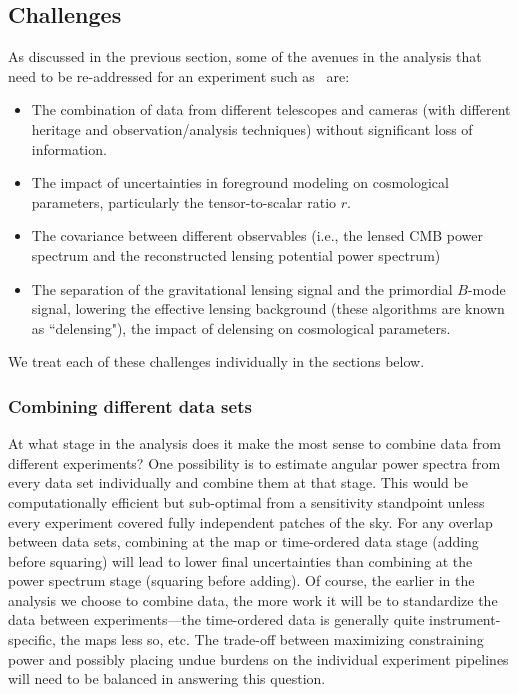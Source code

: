\subsection{Challenges}
\label{se:challenges}
As discussed in the previous section, some of the avenues in the analysis that need to be re-addressed for an experiment such as \cmbexp\ are: 
\begin{itemize}
\item{The combination of data from different telescopes and cameras (with different heritage 
and observation/analysis techniques) without significant loss of information.}
\item{The impact of uncertainties in foreground modeling on cosmological parameters, particularly the tensor-to-scalar ratio $r$.}
\item{The covariance between different observables (i.e., the lensed CMB power spectrum and the reconstructed lensing potential power spectrum)}
\item{The separation of the gravitational lensing signal and the primordial $B$-mode signal, lowering the effective lensing background (these algorithms are known as ``delensing"), the impact of delensing on cosmological parameters.} 
\end{itemize}
We treat each of these challenges individually in the sections below.

\subsubsection{Combining different data sets}
\label{se:combine}
At what stage in the analysis does it make the most sense to combine data from different experiments? 
One possibility is to estimate
angular power spectra from every data set individually and combine them at that stage. This would
be computationally efficient but sub-optimal from a sensitivity standpoint unless every experiment
covered fully independent patches of the sky. For any overlap between data sets, combining at
the map or time-ordered data stage (adding before squaring) will lead to lower final uncertainties
than combining at the power spectrum stage (squaring before adding). Of course, the earlier in the analysis
we choose to combine data, the more work it will be to standardize the data between experiments---the
time-ordered data is generally quite instrument-specific, the maps less so, etc. The trade-off between
maximizing constraining power and possibly placing undue burdens on the individual experiment 
pipelines will need to be balanced in answering this question.

